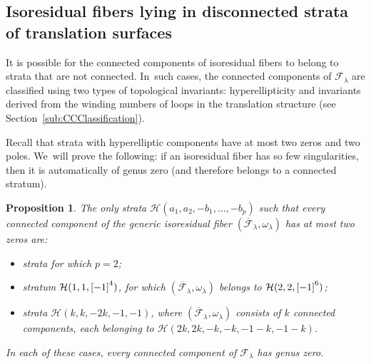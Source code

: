 \documentclass[11pt]{article}
\newcommand{\Subsection}{\subsection}
\newtheorem{prop}[thm]{Proposition}
\theoremstyle{definition}
\begin{document}
\Subsection{Isoresidual fibers lying in disconnected strata of translation surfaces}

It is possible for the connected components of isoresidual fibers to belong to strata that are not connected. In~such cases, the connected components of $\mathcal F_\lambda$ are classified using two types of topological invariants: hyperellipticity and invariants derived from the winding numbers of loops in the translation structure (see Section~\ref{sub:CCClassification}).

Recall that strata with hyperelliptic components have at most two zeros and two poles. We~will prove the following: if an isoresidual fiber has so few singularities, then it is automatically of genus zero (and therefore belongs to a connected stratum).
\begin{prop}\label{prop:AdditionalTwozeros}
The only strata $\mathcal{H}(a_{1},a_{2},-b_{1},\dots,-b_{p})$ such that every connected component of the generic isoresidual fiber $(\overline{\mathcal{F}}_{\lambda},\omega_{\lambda})$ has at most two zeros are:
\begin{itemize}
\item strata for which $p=2$;
\item stratum $\mathcal{H}(1,1,\rec[-1][4])$, for which $(\overline{\mathcal{F}}_{\lambda},\omega_{\lambda})$ belongs to $\mathcal{H}(2,2,\rec[-1][6])$;
\item strata $\mathcal{H}(k,k,-2k,-1,-1)$, where $(\overline{\mathcal{F}}_{\lambda},\omega_{\lambda})$ consists of $k$ connected components, each belonging to $\mathcal{H}(2k,2k,-k,-k,-1-k,-1-k)$.
\end{itemize}
In each of these cases, every connected component of $\mathcal{F}_{\lambda}$ has genus zero.
\end{prop}
\end{document}
